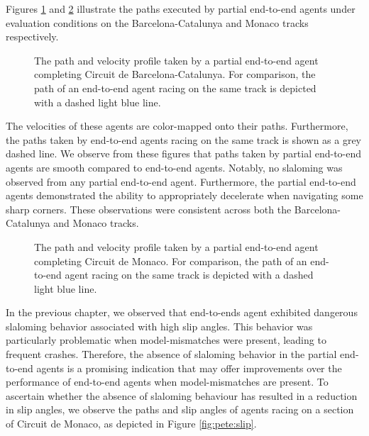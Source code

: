 Figures \ref{fig:esp_eval} and \ref{fig:mco_eval} illustrate the paths executed by partial end-to-end agents under evaluation conditions on the Barcelona-Catalunya and Monaco tracks respectively.
\begin{figure}[htb!]
    \centering
    
    \caption[The path and velocity profile taken by a partial end-to-end agent completing Circuit de Barcelona-Catalunya]{The path and velocity profile taken by a partial end-to-end agent completing Circuit de Barcelona-Catalunya. For comparison, the path of an end-to-end agent racing on the same track is depicted with a dashed light blue line.}
    \label{fig:esp_eval}
\end{figure}
The velocities of these agents are color-mapped onto their paths.
Furthermore, the paths taken by end-to-end agents racing on the same track is shown as a grey dashed line.
We observe from these figures that paths taken by partial end-to-end agents are smooth compared to end-to-end agents.
Notably, no slaloming was observed from any partial end-to-end agent.
Furthermore, the partial end-to-end agents demonstrated the ability to appropriately decelerate when navigating some sharp corners.
These observations were consistent across both the Barcelona-Catalunya and Monaco tracks.
\begin{figure}[htb!]
    \centering
    
    \caption[The path and velocity profile taken by a partial end-to-end agent completing Circuit de Monaco]{The path and velocity profile taken by a partial end-to-end agent completing Circuit de Monaco. For comparison, the path of an end-to-end agent racing on the same track is depicted with a dashed light blue line.}
    \label{fig:mco_eval}
\end{figure}


In the previous chapter, we observed that end-to-ends agent exhibited dangerous slaloming behavior associated with high slip angles. 
This behavior was particularly problematic when model-mismatches were present, leading to frequent crashes.
Therefore, the absence of slaloming behavior in the partial end-to-end agents is a promising indication that may offer improvements over the performance of end-to-end agents  when model-mismatches are present. 
To ascertain whether the absence of slaloming behaviour has resulted in a reduction in slip angles, we observe the paths and slip angles of agents racing on a section of Circuit de Monaco, as depicted in Figure \ref{fig:pete:slip}.

